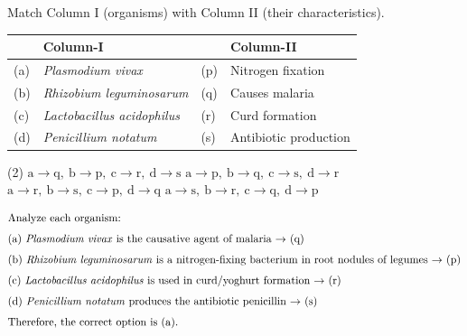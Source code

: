 
\item Match Column I (organisms) with Column II (their characteristics).

\begin{center}
    \renewcommand{\arraystretch}{2}
    \begin{tabular}{@{}p{}p{}|p{}p{}@{}}
    \hline
    & \textbf{Column-I} & & \textbf{Column-II} \\
    \hline
    (a) & \textit{Plasmodium vivax} & (p) & Nitrogen fixation \\
    (b) & \textit{Rhizobium leguminosarum} & (q) & Causes malaria \\
    (c) & \textit{Lactobacillus acidophilus} & (r) & Curd formation \\
    (d) & \textit{Penicillium notatum} & (s) & Antibiotic production \\
    \hline
    \end{tabular}
\end{center}

\begin{tasks}(2)
    \task $\mathrm{a\rightarrow q,\ b\rightarrow p,\ c\rightarrow r,\ d\rightarrow s}$ \ans
    \task $\mathrm{a\rightarrow p,\ b\rightarrow q,\ c\rightarrow s,\ d\rightarrow r}$
    \task $\mathrm{a\rightarrow r,\ b\rightarrow s,\ c\rightarrow p,\ d\rightarrow q}$
    \task $\mathrm{a\rightarrow s,\ b\rightarrow r,\ c\rightarrow q,\ d\rightarrow p}$
\end{tasks}

\begin{solution}
    \begin{align*}
        \intertext{Analyze each organism:}
        \intertext{(a) \textit{Plasmodium vivax} is the causative agent of malaria $\rightarrow$ (q)}
        \intertext{(b) \textit{Rhizobium leguminosarum} is a nitrogen-fixing bacterium in root nodules of legumes $\rightarrow$ (p)}
        \intertext{(c) \textit{Lactobacillus acidophilus} is used in curd/yoghurt formation $\rightarrow$ (r)}
        \intertext{(d) \textit{Penicillium notatum} produces the antibiotic penicillin $\rightarrow$ (s)}
        \intertext{Therefore, the correct option is (a).}
    \end{align*}
\end{solution}
